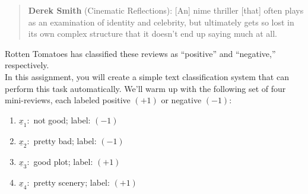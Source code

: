 \documentclass{article}
\theoremstyle{definition}
\begin{document}
\begin{question}
\begin{quote}
		\textbf{Derek Smith} (Cinematic Reflections): [An] nime thriller [that] often plays as an examination of identity and celebrity, but ultimately gets so lost in its own complex structure that it doesn't end up saying much at all.
	\end{quote}
	
	Rotten Tomatoes has classified these reviews as ``positive'' and ``negative,'' respectively.\\
	
	In this assignment, you will create a simple text classification system that can perform this task automatically. We'll warm up with the following set of four mini-reviews, each labeled positive $(+1)$ or negative $(-1)$:
	\begin{enumerate}
		\item $\underline{x}_1:$ not good; label: $(-1)$
		\item $\underline{x}_2:$ pretty bad; label: $(-1)$
		\item $\underline{x}_3:$ good plot; label: $(+1)$
		\item $\underline{x}_4:$ pretty scenery; label: $(+1)$
	\end{enumerate}
	

\end{question}
\end{document}
